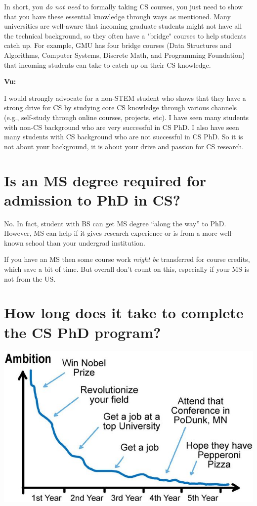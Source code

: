 \documentclass[oneside,11pt]{memoir}
\newenvironment{commentbox}[1][]{
\small
    \begin{mybox}
    {\small \textbf{#1}}
 }{
   \end{mybox}
}
\begin{document}
In short, you \emph{do not need} to formally taking CS courses, you just need to show that you have these essential knowledge through ways as mentioned. Many universities are well-aware that incoming graduate students might not have all the technical background, so they often have a "bridge" courses to help students catch up.  For example, GMU has four bridge courses (Data Structures and Algorithms, Computer Systems, Discrete Math, and Programming Foundation) that incoming students can take to catch up on their CS knowledge.

\begin{commentbox}[Vu:]
    I would strongly advocate for a non-STEM student who shows that they have a strong drive for CS by studying core CS knowledge through various channels (e.g., self-study through online courses, projects, etc).  I have seen many students with non-CS background who are very successful in CS PhD.  I also have seen many students with CS background who are not successful in CS PhD.  So it is not about your background, it is about your drive and passion for CS research.
\end{commentbox}

\section{Is an MS degree required for admission to PhD in CS?}\label{sec:msrequirement}
No. In fact, student with BS can get MS degree ``along the way'' to PhD.  However, MS can help if it gives research experience or is from a more well-known school than your undergrad institution. 

If you have an MS then some course work \emph{might be} transferred for course credits, which save a bit of time. But overall don't count on this, especially if your MS is not from the US. 


\section{How long does it take to complete the CS PhD program?}\label{sec:time}


\begin{center}
\includegraphics[scale=0.3]{c4a.png}
\end{center}
\end{document}
